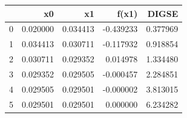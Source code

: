 \begin{tabular}{lrrrr}
\toprule
 & x0 & x1 & f(x1) & DIGSE \\
\midrule
0 & 0.020000 & 0.034413 & -0.439233 & 0.377969 \\
1 & 0.034413 & 0.030711 & -0.117932 & 0.918854 \\
2 & 0.030711 & 0.029352 & 0.014978 & 1.334480 \\
3 & 0.029352 & 0.029505 & -0.000457 & 2.284851 \\
4 & 0.029505 & 0.029501 & -0.000002 & 3.813015 \\
5 & 0.029501 & 0.029501 & 0.000000 & 6.234282 \\
\bottomrule
\end{tabular}
